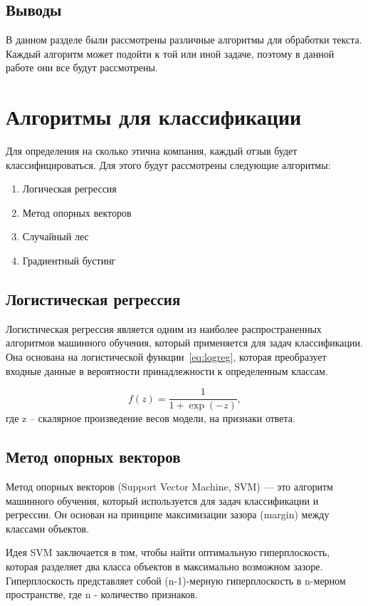 \documentclass[PI, VKR]{HSEUniversity}
\begin{document}
\subsection{Выводы}
\label{sec:org68bb29d}
В данном разделе были рассмотрены различные алгоритмы для обработки текста. Каждый алгоритм может подойти к той или иной задаче, поэтому в данной работе они все будут рассмотрены.
\section{Алгоритмы для классификации}
\label{sec:org9375b77}
Для определения на сколько этична компания, каждый отзыв будет классифицироваться. Для этого будут рассмотрены следующие алгоритмы:
\begin{enumerate}
\item Логическая регрессия
\item Метод опорных векторов
\item Случайный лес
\item Градиентный бустинг
\end{enumerate}
\subsection{Логистическая регрессия}
\label{sec:orgc68ee15}
Логистическая регрессия\autocite{fan_liblinear_2008} является одним из наиболее распространенных алгоритмов машинного обучения, который применяется для задач классификации. Она основана на логистической функции~\ref{eq:logreg}, которая преобразует входные данные в вероятности принадлежности к определенным классам.

\begin{equation}
\label{eq:logreg}
f(z)=\frac{1}{1+\exp(-z)},
\end{equation}
где z -- скалярное произведение весов модели, на признаки ответа.
\subsection{Метод опорных векторов}
\label{sec:orgad5c88d}
Метод опорных векторов\autocite{platt_probabilistic_2000} (Support Vector Machine, SVM) — это алгоритм машинного обучения, который используется для задач классификации и регрессии. Он основан на принципе максимизации зазора (margin) между классами объектов.

Идея SVM заключается в том, чтобы найти оптимальную гиперплоскость, которая разделяет два класса объектов в максимально возможном зазоре. Гиперплоскость представляет собой (n-1)-мерную гиперплоскость в n-мерном пространстве, где n - количество признаков.
\end{document}
